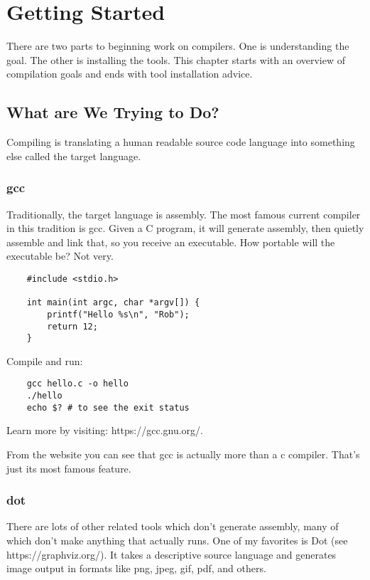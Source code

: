 \chapter{Getting Started}

There are two parts to beginning work on compilers. One is understanding
the goal. The other is installing the tools. This chapter starts with
an overview of compilation goals and ends with tool installation advice.

\section{What are We Trying to Do?}

Compiling is translating a human readable source code language
into something else called the target language.

\subsection{gcc}

Traditionally, the target language is assembly. The most famous
current compiler in this tradition is gcc. Given a C program,
it will generate assembly, then quietly assemble and link that, so you
receive an executable. How portable will the executable be? Not very.

{\footnotesize
\begin{verbatim}
    #include <stdio.h>

    int main(int argc, char *argv[]) {
        printf("Hello %s\n", "Rob");
        return 12;
    }
\end{verbatim}
}

Compile and run:

{\footnotesize
\begin{verbatim}
    gcc hello.c -o hello
    ./hello
    echo $? # to see the exit status
\end{verbatim}
}

Learn more by visiting: https://gcc.gnu.org/.

From the website you can see that gcc is actually more than a c compiler.
That's just its most famous feature.

\subsection{dot}

There are lots of other related tools which don't generate assembly,
many of which don't make anything that actually runs. One of my favorites
is Dot (see https://graphviz.org/). It takes a descriptive source
language and generates image output in formats like png, jpeg, gif,
pdf, and others.

